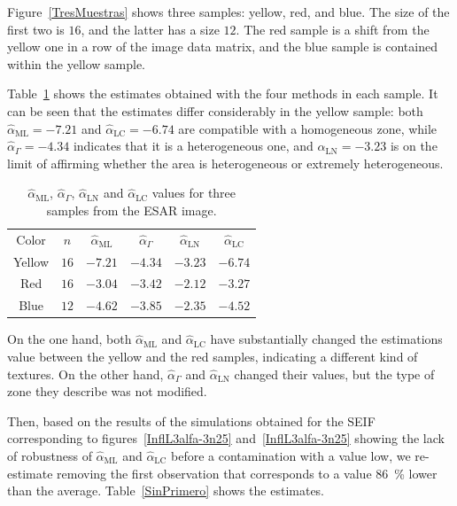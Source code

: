 \documentclass[twocolumn]{svjour3}
\begin{document}
	Figure~\ref{TresMuestras} shows three samples: yellow, red, and blue. 
	The size of the first two is $16$, and the latter has a size $12$. 
	The red sample is a shift from the yellow one in a row of the image data matrix, and the blue sample is contained within the yellow sample.
	
	Table~\ref{TablaTresMuestras} shows the estimates obtained with the four methods in each sample. 
	It can be seen that the estimates differ considerably in the yellow sample: 
	both $\widehat{\alpha}_{\text{{ML}}}=-7.21$ and $\widehat{\alpha}_{\text{{LC}}}=-6.74$ are compatible with a homogeneous zone, while $\widehat{\alpha}_{\Gamma}=-4.34$ indicates that it is a heterogeneous one, and $\widehat{\alpha}_{\text{{LN}}}=-3.23$ is on the limit of affirming whether the area is heterogeneous or extremely heterogeneous.
	
	\begin{table}[hbt]
		\centering
		\caption{ $\widehat{\alpha}_{\text{{ML}}}$, $\widehat{\alpha}_{\Gamma}$, $\widehat{\alpha}_{\text{{LN}}}$ and $\widehat{\alpha}_{\text{{LC}}}$ values for three samples from the ESAR image.}\label{TablaTresMuestras}
		\begin{tabular}{c*5{c}}
			\toprule
			Color       &  $n$    &  $\widehat{\alpha}_{\text{{ML}}}$    &  $\widehat{\alpha}_{\Gamma}$  &  $\widehat{\alpha}_{\text{{LN}}}$ &  $\widehat{\alpha}_{\text{{LC}}}$\\
			\cmidrule(lr){1-6}
			Yellow      & $16$  & $-7.21$ & $-4.34$ & $-3.23$ & $-6.74$\\
			Red         & $16$  & $-3.04$ & $-3.42$ & $-2.12$ & $-3.27$\\
			Blue        & $12$  & $-4.62$ & $-3.85$ & $-2.35$ & $-4.52$\\
			\bottomrule
		\end{tabular}
	\end{table} 
	
	On the one hand, both $\widehat{\alpha}_{\text{{ML}}}$ and $\widehat{\alpha}_{\text{{LC}}}$ have substantially changed the estimations value between the yellow and the red samples, indicating a different kind of textures. 
	On the other hand, $\widehat{\alpha}_{\Gamma}$ and $\widehat{\alpha}_{\text{{LN}}}$ changed their values, but the type of zone they describe was not modified.
	
	Then, based on the results of the simulations obtained for the SEIF corresponding to figures~\ref{InflL3alfa-3n25} and~\ref{InflL3alfa-3n25} showing the lack of robustness of $\widehat{\alpha}_{\text{{ML}}}$ and $\widehat{\alpha}_{\text{{LC}}}$ before a contamination with a value low, we re-estimate removing the first observation that corresponds to a value \SI{86}{\percent} lower than the average. 
	Table~\ref{SinPrimero} shows the estimates.
	
\end{document}
